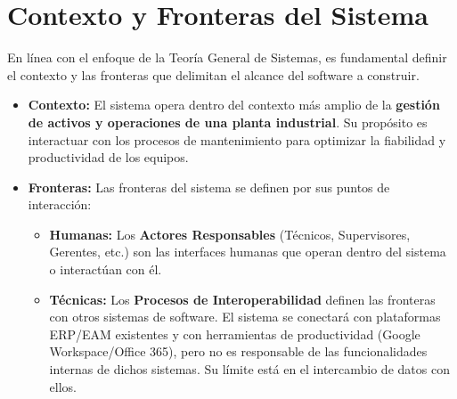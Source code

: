 \section{Contexto y Fronteras del Sistema}

En línea con el enfoque de la Teoría General de Sistemas, es fundamental definir el contexto y las fronteras que delimitan el alcance del software a construir.

\begin{itemize}
    \item \textbf{Contexto:} El sistema opera dentro del contexto más amplio de la \textbf{gestión de activos y operaciones de una planta industrial}. Su propósito es interactuar con los procesos de mantenimiento para optimizar la fiabilidad y productividad de los equipos.
    \item \textbf{Fronteras:} Las fronteras del sistema se definen por sus puntos de interacción:
    \begin{itemize}
        \item \textbf{Humanas:} Los \textbf{Actores Responsables} (Técnicos, Supervisores, Gerentes, etc.) son las interfaces humanas que operan dentro del sistema o interactúan con él.
        \item \textbf{Técnicas:} Los \textbf{Procesos de Interoperabilidad} definen las fronteras con otros sistemas de software. El sistema se conectará con plataformas ERP/EAM existentes y con herramientas de productividad (Google Workspace/Office 365), pero no es responsable de las funcionalidades internas de dichos sistemas. Su límite está en el intercambio de datos con ellos.
    \end{itemize}
\end{itemize}

